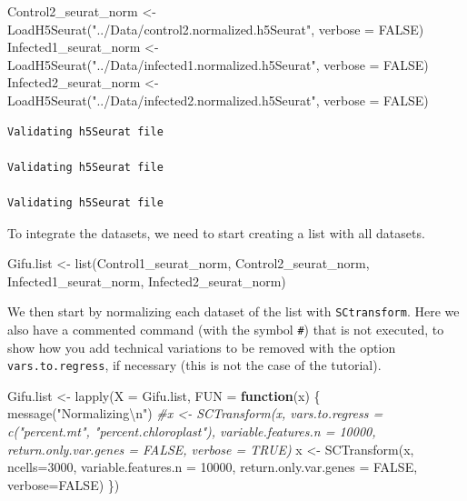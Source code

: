\documentclass[
  letterpaper,
  DIV=11,
  numbers=noendperiod]{scrartcl}
\newenvironment{Shaded}{}{}
\newcommand{\AttributeTok}[1]{\textcolor[rgb]{0.49,0.56,0.16}{#1}}
\newcommand{\CommentTok}[1]{\textcolor[rgb]{0.38,0.63,0.69}{\textit{#1}}}
\newcommand{\ConstantTok}[1]{\textcolor[rgb]{0.53,0.00,0.00}{#1}}
\newcommand{\ControlFlowTok}[1]{\textcolor[rgb]{0.00,0.44,0.13}{\textbf{#1}}}
\newcommand{\DecValTok}[1]{\textcolor[rgb]{0.25,0.63,0.44}{#1}}
\newcommand{\FunctionTok}[1]{\textcolor[rgb]{0.02,0.16,0.49}{#1}}
\newcommand{\NormalTok}[1]{#1}
\newcommand{\OtherTok}[1]{\textcolor[rgb]{0.00,0.44,0.13}{#1}}
\newcommand{\SpecialCharTok}[1]{\textcolor[rgb]{0.25,0.44,0.63}{#1}}
\newcommand{\StringTok}[1]{\textcolor[rgb]{0.25,0.44,0.63}{#1}}
\begin{document}
\begin{Shaded}
\begin{Highlighting}[]
\NormalTok{Control2\_seurat\_norm }\OtherTok{\textless{}{-}} \FunctionTok{LoadH5Seurat}\NormalTok{(}\StringTok{"../Data/control2.normalized.h5Seurat"}\NormalTok{, }\AttributeTok{verbose =} \ConstantTok{FALSE}\NormalTok{)}
\NormalTok{Infected1\_seurat\_norm }\OtherTok{\textless{}{-}} \FunctionTok{LoadH5Seurat}\NormalTok{(}\StringTok{"../Data/infected1.normalized.h5Seurat"}\NormalTok{, }\AttributeTok{verbose =} \ConstantTok{FALSE}\NormalTok{)}
\NormalTok{Infected2\_seurat\_norm }\OtherTok{\textless{}{-}} \FunctionTok{LoadH5Seurat}\NormalTok{(}\StringTok{"../Data/infected2.normalized.h5Seurat"}\NormalTok{, }\AttributeTok{verbose =} \ConstantTok{FALSE}\NormalTok{)}
\end{Highlighting}
\end{Shaded}

\begin{verbatim}
Validating h5Seurat file

Validating h5Seurat file

Validating h5Seurat file
\end{verbatim}

To integrate the datasets, we need to start creating a list with all
datasets.

\begin{Shaded}
\begin{Highlighting}[]
\NormalTok{Gifu.list }\OtherTok{\textless{}{-}} \FunctionTok{list}\NormalTok{(Control1\_seurat\_norm, }
\NormalTok{                  Control2\_seurat\_norm, }
\NormalTok{                  Infected1\_seurat\_norm, }
\NormalTok{                  Infected2\_seurat\_norm)}
\end{Highlighting}
\end{Shaded}

We then start by normalizing each dataset of the list with
\texttt{SCtransform}. Here we also have a commented command (with the
symbol \texttt{\#}) that is not executed, to show how you add technical
variations to be removed with the option \texttt{vars.to.regress}, if
necessary (this is not the case of the tutorial).

\begin{Shaded}
\begin{Highlighting}[]
\NormalTok{Gifu.list }\OtherTok{\textless{}{-}} \FunctionTok{lapply}\NormalTok{(}\AttributeTok{X =}\NormalTok{ Gifu.list, }\AttributeTok{FUN =} \ControlFlowTok{function}\NormalTok{(x) \{}
  \FunctionTok{message}\NormalTok{(}\StringTok{"Normalizing}\SpecialCharTok{\textbackslash{}n}\StringTok{"}\NormalTok{)}
  \CommentTok{\#x \textless{}{-} SCTransform(x, vars.to.regress = c("percent.mt",  "percent.chloroplast"), variable.features.n = 10000, return.only.var.genes = FALSE, verbose = TRUE)}
\NormalTok{  x }\OtherTok{\textless{}{-}} \FunctionTok{SCTransform}\NormalTok{(x, }\AttributeTok{ncells=}\DecValTok{3000}\NormalTok{, }\AttributeTok{variable.features.n =} \DecValTok{10000}\NormalTok{, }\AttributeTok{return.only.var.genes =} \ConstantTok{FALSE}\NormalTok{, }\AttributeTok{verbose=}\ConstantTok{FALSE}\NormalTok{)}
\NormalTok{\})}
\end{Highlighting}
\end{Shaded}
\end{document}
